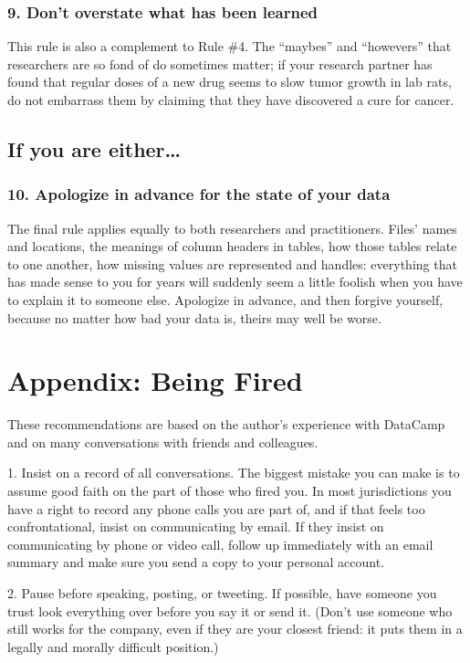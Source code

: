 \documentclass[10pt,letterpaper]{article}
\begin{document}
\subsubsection*{9. Don't overstate what has been learned}

This rule is also a complement to Rule \#4. The ``maybes'' and ``howevers'' that
researchers are so fond of do sometimes matter; if your research partner has
found that regular doses of a new drug seems to slow tumor growth in lab rats,
do not embarrass them by claiming that they have discovered a cure for cancer.

\subsection*{If you are either{\ldots}}

\subsubsection*{10. Apologize in advance for the state of your data}

The final rule applies equally to both researchers and practitioners. Files'
names and locations, the meanings of column headers in tables, how those tables
relate to one another, how missing values are represented and handles:
everything that has made sense to you for years will suddenly seem a little
foolish when you have to explain it to someone else. Apologize in advance, and
then forgive yourself, because no matter how bad your data is, theirs may well
be worse.

\section*{Appendix: Being Fired}

These recommendations are based on the author's experience with DataCamp \cite{Alba2019}
and on many conversations with friends and colleagues.

1. Insist on a record of all conversations.
   The biggest mistake you can make is to assume good faith on the part of those
   who fired you.  In most jurisdictions you have a right to record any phone calls
   you are part of, and if that feels too confrontational, insist on communicating
   by email.  If they insist on communicating by phone or video call, follow up
   immediately with an email summary and make sure you send a copy to your personal
   account.

2. Pause before speaking, posting, or tweeting.
   If possible, have someone you trust look everything over before you say it or
   send it.  (Don't use someone who still works for the company, even if they are
   your closest friend: it puts them in a legally and morally difficult position.)
\end{document}

